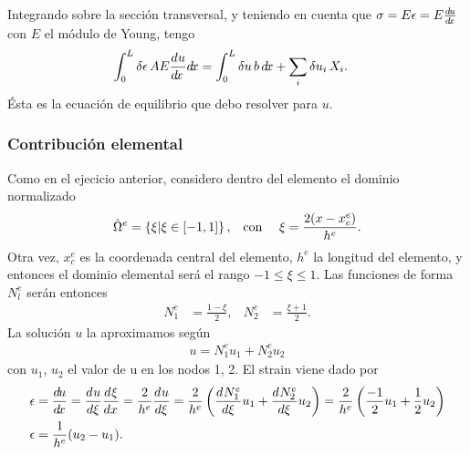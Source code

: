 \documentclass[a4paper,11pt,oneside]{article}
\begin{document}
Integrando sobre la sección transversal, y teniendo en cuenta que $\sigma=E\epsilon=E\frac{d^{}\!u}{d\!x^{}}$ con $E$ el módulo de Young, tengo
\begin{align*}
  \int_0^L \delta\epsilon\,A E\frac{d^{\,}\!u}{d\!x^{\,}}d\!x   &= \int_0^L \delta u\,b\,d\!x + \sum_i \delta u_i\, X_i .
\end{align*}
Ésta es la ecuación de equilibrio que debo resolver para $u$.
%
\subsubsection*{Contribución elemental}
Como en el ejecicio anterior, considero dentro del elemento el dominio normalizado
\begin{align*}
  \hat\Omega^e=\left\{\xi|\xi\in[-1,1]\right\}, && \textrm{con } && \xi=\frac{2(x-x_c^e)}{h^e}.
\end{align*}
Otra vez, $x_c^e$ es la coordenada central del elemento, $h^e$ la longitud del elemento, y entonces
el dominio elemental será el rango $-1\leq\xi\leq 1$.
Las funciones de forma $N^e_{l}$ serán entonces
\begin{align*}
  N_1^e &= \frac{1-\xi}{2},& N_2^e &= \frac{\xi+1}{2}.
\end{align*}
La solución $u$ la aproximamos según
\begin{align*}
  u = N_1^e u_1 + N_2^e u_2
\end{align*}
con $u_1$, $u_2$ el valor de u en los nodos 1, 2. El strain viene dado por
\begin{align*}
  \epsilon &= \frac{d^{}\!u}{d\!x^{}} = \frac{d^{}u}{d{\xi}^{}} \frac{d^{}\xi}{d{x}^{}} = \frac{2}{h^e} \frac{d^{}u}{d{\xi}^{}}
                      = \frac{2}{h^e} \left(\frac{d^{}N_1^e}{d{\xi}^{}} u_1 + \frac{d^{}N_2^e}{d{\xi}^{}} u_2\right)
                      = \frac{2}{h^e} \left(\frac{-1}{2} u_1 + \frac{1}{2} u_2\right) \\
  \epsilon &= \frac{1}{h^e}(u_2-u_1).
\end{align*}
\end{document}
